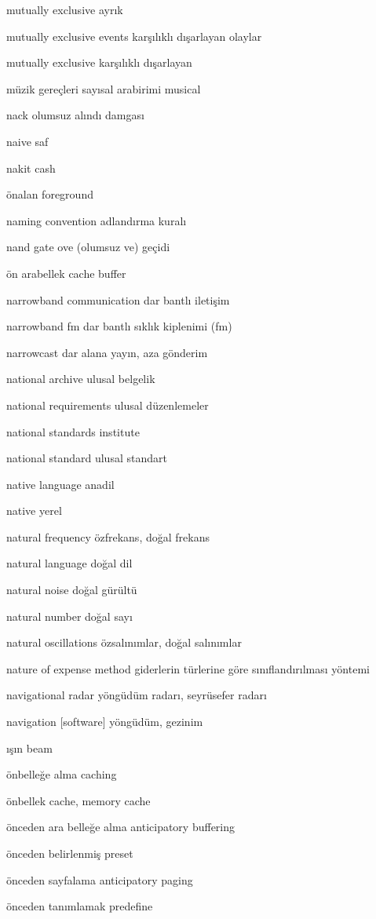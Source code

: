 \documentclass[12pt,fleqn]{article}\usepackage{../../common}
\begin{document}
mutually exclusive ayrık

mutually exclusive events karşılıklı dışarlayan olaylar

mutually exclusive karşılıklı dışarlayan

müzik gereçleri sayısal arabirimi musical

nack olumsuz alındı damgası

naive saf

nakit cash

önalan foreground

naming convention adlandırma kuralı

nand gate ove (olumsuz ve) geçidi

ön arabellek cache buffer

narrowband communication dar bantlı iletişim

narrowband fm dar bantlı sıklık kiplenimi (fm)

narrowcast dar alana yayın, aza gönderim

national archive ulusal belgelik

national requirements ulusal düzenlemeler

national standards institute

national standard ulusal standart

native language anadil

native yerel

natural frequency özfrekans, doğal frekans

natural language doğal dil

natural noise doğal gürültü

natural number doğal sayı

natural oscillations özsalınımlar, doğal salınımlar

nature of expense method giderlerin türlerine göre sınıflandırılması yöntemi

navigational radar yöngüdüm radarı, seyrüsefer radarı

navigation [software] yöngüdüm, gezinim

ışın beam

önbelleğe alma caching

önbellek cache, memory cache

önceden ara belleğe alma anticipatory buffering

önceden belirlenmiş preset

önceden sayfalama anticipatory paging

önceden tanımlamak predefine
\end{document}
